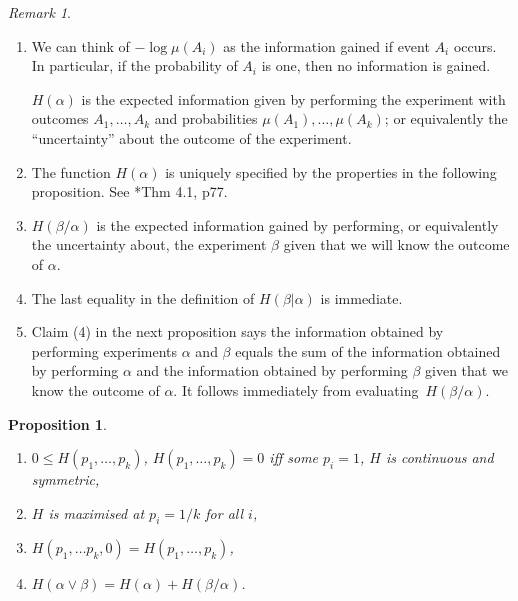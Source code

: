 \documentclass[a4paper]{amsart}
\theoremstyle{plain}
\newtheorem{proposition}[theorem]{Proposition}
\theoremstyle{definition}
\theoremstyle{remark}
\newtheorem{remark}[theorem]{Remark}
\begin{document}
 \begin{remark}\mbox{}
 \begin{enumerate}

\item We can think of $ -\log \mu(A_i) $ as the information gained if event $ A_i $ occurs.  In particular, if the probability of $ A_i $ is one, then no information is gained.
 
 $ H(\alpha)$ is the expected information given by performing the experiment with outcomes $ A_1,\dots, A_k $ and probabilities $ \mu(A_1),\dots, \mu(A_k) $; or equivalently the  ``uncertainty'' about the outcome of the experiment.
 
 \item The function $ H(\alpha) $ is  uniquely specified by the properties in the following proposition.  See \cite{Wal}*{Thm 4.1, p77}.
 
\item $ H(\beta/\alpha)  $ is the expected information gained by performing, or equivalently the uncertainty about, the experiment $ \beta $ given that we will know the outcome of $ \alpha $.

\item The last equality in the definition of $ H( \beta | \alpha ) $  is immediate.

\item Claim (4) in the next proposition says the information obtained by performing experiments $ \alpha $ and $ \beta $ equals the sum of the information obtained by performing $ \alpha $ and the information obtained by performing $ \beta$ given  that we know the outcome of $ \alpha $.
It follows immediately from evaluating~$ H(\beta/\alpha) $.
\end{enumerate} 
  \end{remark} 
 
 
\begin{proposition} \label{entprp} \mbox{}
\begin{enumerate}

\item $ 0 \leq H(p_1,\dots, p_k)  $, $ H (p_1,\dots, p_k) = 0 $ iff some $ p_i=1 $, $ H $ is continuous and symmetric,
\item $ H $ is maximised at $ p_i=1/k $ for all $ i $,
\item $ H(p_1,\dots p_k,0) = H(p_1,\dots, p_k)$,
\item $ H(\alpha\vee \beta ) = H(\alpha) + H(\beta / \alpha )$.
\end{enumerate} 
\end{proposition}
\end{document}
